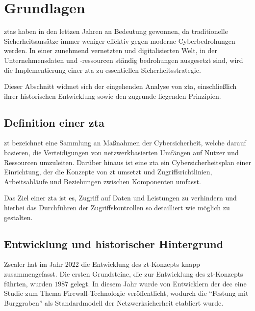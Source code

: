 \newpage


\section{Grundlagen}\label{sec:grundlagen}
\acp{zta} haben in den lettzen Jahren an Bedeutung gewonnen, da traditionelle Sicherheitsansätze immer weniger effektiv gegen moderne Cyberbedrohungen werden.
In einer zunehmend vernetzten und digitalisierten Welt, in der Unternehmensdaten und -ressourcen ständig bedrohungen ausgesetzt sind, wird die Implementierung einer \ac{zta} zu essentiellen Sicherheitsstrategie.

Dieser Abschnitt widmet sich der eingehenden Analyse von \ac{zta}, einschließlich ihrer historischen Entwicklung sowie den zugrunde liegenden Prinzipien.

\subsection[Definition einer Zero-Trust-Architektur]{Definition einer \ac{zta}}\label{subsec:definition-einer-zta}
\ac{zt} bezeichnet eine Sammlung an Maßnahmen der Cybersicherheit, welche darauf basieren, die Verteidigungen von netzwerkbasierten Umfängen auf Nutzer und Ressourcen umzuleiten\autocite[\vglf][]{NIST:800207}.
Darüber hinaus ist eine \ac{zta} ein Cybersicherheitsplan einer Einrichtung, der die Konzepte von \ac{zt} umsetzt und Zugriffsrichtlinien, Arbeitsabläufe und Beziehungen zwischen Komponenten umfasst.\autocite[\vglf][]{NIST:800207}

Das Ziel einer \ac{zta} ist es,  Zugriff auf Daten und Leistungen zu verhindern und hierbei das Durchführen der Zugriffskontrollen so detailliert wie möglich zu gestalten.


\subsection{Entwicklung und historischer Hintergrund}\label{subsec:entwicklung-und-historischer-hintergrund}
Zscaler hat im Jahr 2022 die Entwicklung des \ac{zt}-Konzepts knapp zusammengefasst.\autocites[\vglf][]{zscaler-2022b}
Die ersten Grundsteine, die zur Entwicklung des \ac{zt}-Konzepts führten, wurden $1987$ gelegt.
In diesem Jahr wurde von Entwicklern der \ac{dec} eine Studie zum Thema Firewall-Technologie veröffentlicht, wodurch die \enquote{Festung mit Burggraben} als Standardmodell der Netzwerksicherheit etabliert wurde.\autocites[\vglf][]{zscaler-2022b}

